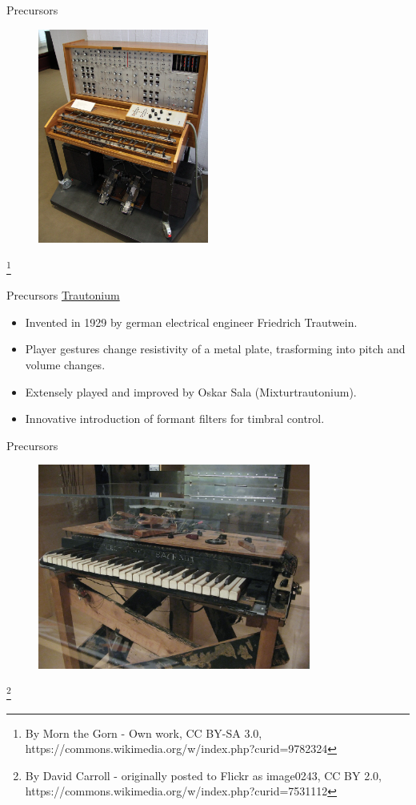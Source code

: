 \documentclass{beamer}
\newcommand\blfootnote[1]{%
  \begingroup
  \renewcommand\thefootnote{}\footnote{#1}%
  \addtocounter{footnote}{-1}%
  \endgroup
}
\begin{document}
\begin{frame}{Precursors}
    \begin{figure}[h]
        \includegraphics[width=0.5\textwidth]{trautonium.jpg}
    \end{figure}
\blfootnote{By Morn the Gorn - Own work, CC BY-SA 3.0, https://commons.wikimedia.org/w/index.php?curid=9782324}
\end{frame}

\begin{frame}{Precursors}
    \href{https://www.youtube.com/watch?v=uaWrdbvhg1Q}{Trautonium}
    \vspace{5mm}
    \begin{itemize}
        \item Invented in 1929 by german electrical engineer Friedrich Trautwein.
        \item Player gestures change resistivity of a metal plate, trasforming into pitch and volume changes.
        \item Extensely played and improved by Oskar Sala (Mixturtrautonium).
        \item Innovative introduction of formant filters for timbral control.
    \end{itemize}
\end{frame}

\begin{frame}{Precursors}
    \begin{figure}[h]
        \includegraphics[width=0.8\textwidth]{sackbut.jpg}
    \end{figure}
\blfootnote{By David Carroll - originally posted to Flickr as image0243, CC BY 2.0, https://commons.wikimedia.org/w/index.php?curid=7531112}
\end{frame}
\end{document}
